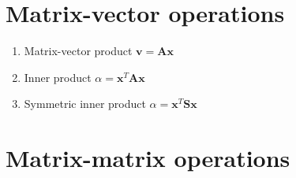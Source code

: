 \documentclass{article}
\begin{document}
\section{Matrix-vector operations}

\begin{enumerate}
\item Matrix-vector product $\mathbf{v} = \mathbf{A} \mathbf{x}$
\item Inner product $\alpha = \mathbf{x}^{T} \mathbf{A} \mathbf{x}$
\item Symmetric inner product $\alpha = \mathbf{x}^{T} \mathbf{S} \mathbf{x}$
\end{enumerate}

\section{Matrix-matrix operations}
\end{document}
